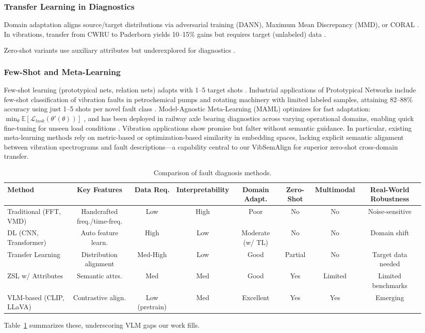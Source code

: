 \subsubsection{Transfer Learning in Diagnostics}
Domain adaptation aligns source/target distributions via adversarial training (DANN), Maximum Mean Discrepancy (MMD), or CORAL \cite{qiao2022grl,li2021mmd,wen2020domain}. In vibrations, transfer from CWRU to Paderborn yields 10--15\% gains but requires target (unlabeled) data \cite{wang2020transfer}.

Zero-shot variants use auxiliary attributes but underexplored for diagnostics \cite{chen2023gzsl}.

\subsubsection{Few-Shot and Meta-Learning}
Few-shot learning (prototypical nets, relation nets) adapts with 1--5 target shots \cite{hoang2023vit}. Industrial applications of Prototypical Networks include few-shot classification of vibration faults in petrochemical pumps and rotating machinery with limited labeled samples, attaining 82--88\% accuracy using just 1--5 shots per novel fault class \cite{hoang2023vit}. Model-Agnostic Meta-Learning (MAML) optimizes for fast adaptation: $\min_\theta \mathbb{E} [\mathcal{L}_{task}(\theta'(\theta))]$ \cite{wen2022maml}, and has been deployed in railway axle bearing diagnostics across varying operational domains, enabling quick fine-tuning for unseen load conditions \cite{wen2022maml}. Vibration applications show promise but falter without semantic guidance. In particular, existing meta-learning methods rely on metric-based or optimization-based similarity in embedding spaces, lacking explicit semantic alignment between vibration spectrograms and fault descriptions---a capability central to our VibSemAlign for superior zero-shot cross-domain transfer.

\begin{table}[t]
\centering
\caption{Comparison of fault diagnosis methods.}
\label{tab:comparison}
\begin{tabular}{@{}lccccccc@{}}
\toprule
Method & Key Features & Data Req. & Interpretability & Domain Adapt. & Zero-Shot & Multimodal & Real-World Robustness \\
\midrule
Traditional (FFT, VMD) & Handcrafted freq./time-freq. & Low & High & Poor & No & No & Noise-sensitive \\
DL (CNN, Transformer) & Auto feature learn. & High & Low & Moderate (w/ TL) & No & No & Domain shift \\
Transfer Learning & Distribution alignment & Med-High & Low & Good & Partial & No & Target data needed \\
ZSL w/ Attributes & Semantic attrs. & Med & Med & Good & Yes & Limited & Limited benchmarks \\
VLM-based (CLIP, LLaVA) & Contrastive align. & Low (pretrain) & Med & Excellent & Yes & Yes & Emerging \\
\bottomrule
\end{tabular}
\end{table}

Table~\ref{tab:comparison} summarizes these, underscoring VLM gaps our work fills.
